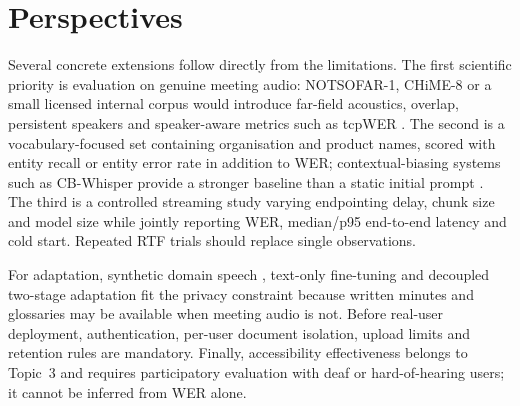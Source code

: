 \documentclass[12pt]{report}
\begin{document}
\section*{Perspectives}
Several concrete extensions follow directly from the limitations. The first scientific priority is evaluation on genuine meeting audio: NOTSOFAR-1, CHiME-8 or a small licensed internal corpus would introduce far-field acoustics, overlap, persistent speakers and speaker-aware metrics such as tcpWER \cite{vinnikov2024notsofar,cornell2024chime8}. The second is a vocabulary-focused set containing organisation and product names, scored with entity recall or entity error rate in addition to WER; contextual-biasing systems such as CB-Whisper provide a stronger baseline than a static initial prompt \cite{li2024cbwhisper}. The third is a controlled streaming study varying endpointing delay, chunk size and model size while jointly reporting WER, median/p95 end-to-end latency and cold start. Repeated RTF trials should replace single observations.

For adaptation, synthetic domain speech \cite{tran2025das}, text-only fine-tuning \cite{fang2025textonly} and decoupled two-stage adaptation \cite{zheng2026twostage} fit the privacy constraint because written minutes and glossaries may be available when meeting audio is not. Before real-user deployment, authentication, per-user document isolation, upload limits and retention rules are mandatory. Finally, accessibility effectiveness belongs to Topic~3 and requires participatory evaluation with deaf or hard-of-hearing users; it cannot be inferred from WER alone.

\renewcommand{\cftchappresnum}{\chaptername~}
\renewcommand{\cftchapnumwidth}{6em}
\cleardoublepage
\printbibliography[heading=subbibliography,
                    title={Bibliography}]
\thispagestyle{fancy}
\newpage
\tableofcontents
\thispagestyle{fancy}
\end{document}
